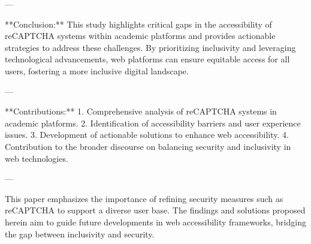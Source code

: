 ---

**Conclusion:**  
This study highlights critical gaps in the accessibility of reCAPTCHA systems within academic platforms and provides actionable strategies to address these challenges. By prioritizing inclusivity and leveraging technological advancements, web platforms can ensure equitable access for all users, fostering a more inclusive digital landscape.

---

**Contributions:**  
1. Comprehensive analysis of reCAPTCHA systems in academic platforms.
2. Identification of accessibility barriers and user experience issues.
3. Development of actionable solutions to enhance web accessibility.
4. Contribution to the broader discourse on balancing security and inclusivity in web technologies.

--- 

This paper emphasizes the importance of refining security measures such as reCAPTCHA to support a diverse user base. The findings and solutions proposed herein aim to guide future developments in web accessibility frameworks, bridging the gap between inclusivity and security.